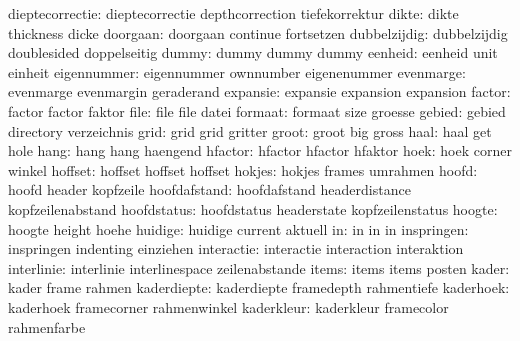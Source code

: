      dieptecorrectie:  dieptecorrectie      depthcorrection      tiefekorrektur
               dikte:  dikte                thickness            dicke
            doorgaan:  doorgaan             continue             fortsetzen
        dubbelzijdig:  dubbelzijdig         doublesided          doppelseitig
               dummy:  dummy                dummy                dummy
             eenheid:  eenheid              unit                 einheit
         eigennummer:  eigennummer          ownnumber            eigenenummer
           evenmarge:  evenmarge            evenmargin           geraderand
            expansie:  expansie             expansion            expansion
              factor:  factor               factor               faktor
                file:  file                 file                 datei
             formaat:  formaat              size                 groesse
              gebied:  gebied               directory            verzeichnis
                grid:  grid                 grid                 gritter
               groot:  groot                big                  gross
                haal:  haal                 get                  hole
                hang:  hang                 hang                 haengend
             hfactor:  hfactor              hfactor              hfaktor
                hoek:  hoek                 corner               winkel
             hoffset:  hoffset              hoffset              hoffset
              hokjes:  hokjes               frames               umrahmen
               hoofd:  hoofd                header               kopfzeile
        hoofdafstand:  hoofdafstand         headerdistance       kopfzeilenabstand
         hoofdstatus:  hoofdstatus          headerstate         kopfzeilenstatus
              hoogte:  hoogte               height               hoehe
             huidige:  huidige              current              aktuell
                  in:  in                   in                   in
          inspringen:  inspringen           indenting            einziehen
          interactie:  interactie           interaction          interaktion
          interlinie:  interlinie           interlinespace       zeilenabstande
               items:  items                items                posten
               kader:  kader                frame                rahmen
         kaderdiepte:  kaderdiepte          framedepth           rahmentiefe
           kaderhoek:  kaderhoek            framecorner          rahmenwinkel
          kaderkleur:  kaderkleur           framecolor           rahmenfarbe
